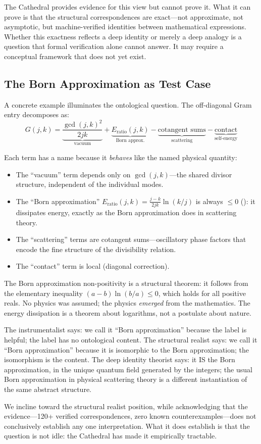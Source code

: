 The Cathedral provides evidence for this view but cannot prove it.
What it can prove is that the structural correspondences are
exact---not approximate, not asymptotic, but machine-verified
identities between mathematical expressions. Whether this exactness
reflects a deep identity or merely a deep analogy is a question
that formal verification alone cannot answer. It may require a
conceptual framework that does not yet exist.

\subsection{The Born Approximation as Test Case}

A concrete example illuminates the ontological question. The
off-diagonal Gram entry decomposes as:
\[
  G(j,k) = \underbrace{\frac{\gcd(j,k)^2}{2jk}}_{\text{vacuum}}
  + \underbrace{E_{\text{ratio}}(j,k)}_{\text{Born approx.}}
  - \underbrace{\text{cotangent sums}}_{\text{scattering}}
  - \underbrace{\text{contact}}_{\text{self-energy}}
\]

Each term has a name because it \emph{behaves} like the named
physical quantity:
\begin{itemize}
  \item The ``vacuum'' term depends only on $\gcd(j,k)$---the
    shared divisor structure, independent of the individual modes.
  \item The ``Born approximation'' $E_{\text{ratio}}(j,k) =
    \frac{j-k}{2jk}\ln(k/j)$ is always $\leq 0$
    (): it dissipates energy, exactly
    as the Born approximation does in scattering theory.
  \item The ``scattering'' terms are cotangent sums---oscillatory
    phase factors that encode the fine structure of the
    divisibility relation.
  \item The ``contact'' term is local (diagonal correction).
\end{itemize}

The Born approximation non-positivity is a structural theorem: it
follows from the elementary inequality $(a-b)\ln(b/a) \leq 0$,
which holds for all positive reals. No physics was assumed; the
physics \emph{emerged} from the mathematics. The energy dissipation
is a theorem about logarithms, not a postulate about nature.

The instrumentalist says: we call it ``Born approximation''
because the label is helpful; the label has no ontological content.
The structural realist says: we call it ``Born approximation''
because it is isomorphic to the Born approximation; the isomorphism
is the content. The deep identity theorist says: it IS the Born
approximation, in the unique quantum field generated by the
integers; the usual Born approximation in physical scattering
theory is a different instantiation of the same abstract structure.

We incline toward the structural realist position, while
acknowledging that the evidence---120+ verified correspondences,
zero known counterexamples---does not conclusively establish any
one interpretation. What it does establish is that the question
is not idle: the Cathedral has made it empirically tractable.
